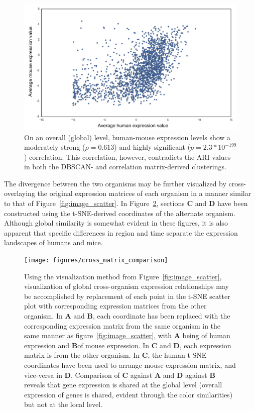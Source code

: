 \documentclass[12pt,oneside,onecolumn,a4paper]{article}
\begin{document}
\begin{figure}[H]
\begin{center}
\includegraphics[width=\columnwidth]{figures/global_correlation}
\caption{On an overall (global) level, human-mouse expression levels show a moderately strong ($\rho=0.613$) and highly significant ($p=2.3*10^{-199}$) correlation. This correlation, however, contradicts the ARI values in both the DBSCAN- and correlation matrix-derived clusterings.\label{fig:global_correlation}%
}
\end{center}
\end{figure}

The divergence between the two organisms may be further visualized by cross-overlaying the original expression matrices of each organism in a manner similar to that of Figure~\ref{fig:image_scatter}. In Figure~\ref{fig:cross_image_scatter}, sections \textbf{C} and \textbf{D} have been constructed using the t-SNE-derived coordinates of the alternate organism. Although global similarity is somewhat evident in these figures, it is also apparent that specific differences in region and time separate the expression landscapes of humans and mice.

\begin{figure}[H]
\begin{center}
\texttt{[image: figures/cross\_matrix\_comparison]}
\caption{Using the visualization method from Figure~\ref{fig:image_scatter}, visualization of global cross-organism expression relationships may be accomplished by replacement of each point in the t-SNE scatter plot with corresponding expression matrices from the other organism. In \textbf{A} and \textbf{B}, each coordinate has been replaced with the corresponding expression matrix from the same organism in the same manner as figure~\ref{fig:image_scatter}, with \textbf{A} being of human expression and \textbf{B}of mouse expression. In \textbf{C} and \textbf{D}, each expression matrix is from the other organism. In \textbf{C}, the human t-SNE coordinates have been used to arrange mouse expression matrix, and vice-versa in \textbf{D}. Comparison of \textbf{C} against \textbf{A} and \textbf{D} against \textbf{B} reveals that gene expression is shared at the global level (overall expression of genes is shared, evident through the color similarities) but not at the local level. \label{fig:cross_image_scatter}%
}
\end{center}
\end{figure}
\end{document}
